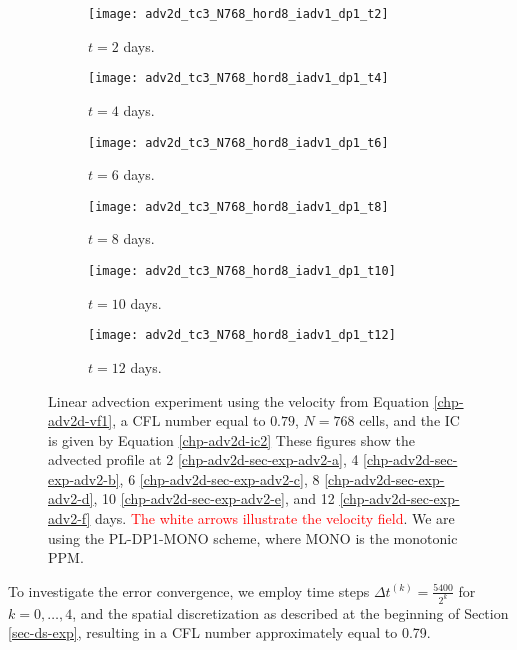 \begin{figure}[!htb]
	\centering
	\begin{subfigure}{0.3\textwidth}
		\centering
		\texttt{[image: adv2d\_tc3\_N768\_hord8\_iadv1\_dp1\_t2]}
		\caption{$t=2$ days.\label{chp-adv2d-sec-exp-adv2-a}}
	\end{subfigure}
	\begin{subfigure}{0.3\textwidth}
		\centering
		\texttt{[image: adv2d\_tc3\_N768\_hord8\_iadv1\_dp1\_t4]}
		\caption{$t=4$ days.\label{chp-adv2d-sec-exp-adv2-b}}
	\end{subfigure}

	\begin{subfigure}{0.3\textwidth}
		\centering
		\texttt{[image: adv2d\_tc3\_N768\_hord8\_iadv1\_dp1\_t6]}
		\caption{$t=6$ days.\label{chp-adv2d-sec-exp-adv2-c}}
	\end{subfigure}
	\begin{subfigure}{0.3\textwidth}
		\centering
		\texttt{[image: adv2d\_tc3\_N768\_hord8\_iadv1\_dp1\_t8]}
		\caption{$t=8$ days.\label{chp-adv2d-sec-exp-adv2-d}}
	\end{subfigure}

	\begin{subfigure}{0.3\textwidth}
		\centering
		\texttt{[image: adv2d\_tc3\_N768\_hord8\_iadv1\_dp1\_t10]}
		\caption{$t=10$ days.\label{chp-adv2d-sec-exp-adv2-e}}
	\end{subfigure}
	\begin{subfigure}{0.3\textwidth}
		\centering
		\texttt{[image: adv2d\_tc3\_N768\_hord8\_iadv1\_dp1\_t12]}
		\caption{$t=12$ days.\label{chp-adv2d-sec-exp-adv2-f}}
	\end{subfigure}
	\caption{Linear advection experiment using the velocity from Equation \eqref{chp-adv2d-vf1},
		a CFL number equal to $0.79$, $N=768$ cells, and the IC is given by 
		Equation \eqref{chp-adv2d-ic2}
		These figures show the advected profile at
		2 \eqref{chp-adv2d-sec-exp-adv2-a}, 
		4  \eqref{chp-adv2d-sec-exp-adv2-b},
		6  \eqref{chp-adv2d-sec-exp-adv2-c},
		8  \eqref{chp-adv2d-sec-exp-adv2-d},
		10  \eqref{chp-adv2d-sec-exp-adv2-e},
		and 12  \eqref{chp-adv2d-sec-exp-adv2-f} days.
\textcolor{red}{The white arrows illustrate the velocity field}.
		We are using the PL-DP1-MONO scheme, where MONO is the monotonic PPM. \label{chp-adv2d-sec-exp-adv2}}
\end{figure}

To investigate the error convergence, we employ time steps $\Delta t^{(k)}=\frac{5400}{2^{k}}$ for 
$k = 0, \ldots, 4$, and the spatial discretization as described at the beginning of Section \ref{sec-ds-exp},
resulting in a CFL number approximately equal to 0.79.

